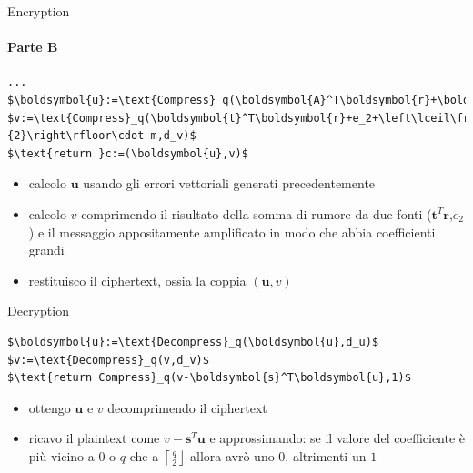 \begin{frame}[fragile]{Encryption}
    \framesubtitle{Parte B}
    \begin{minipage}{0.45\linewidth}
        \begin{lstlisting}[title=Kyber.CPA.Enc(pk\,m):,mathescape=true,firstnumber=4]
...
$\boldsymbol{u}:=\text{Compress}_q(\boldsymbol{A}^T\boldsymbol{r}+\boldsymbol{e_1},d_u)$
$v:=\text{Compress}_q(\boldsymbol{t}^T\boldsymbol{r}+e_2+\left\lceil\frac{q}{2}\right\rfloor\cdot m,d_v)$
$\text{return }c:=(\boldsymbol{u},v)$
        \end{lstlisting}
    \end{minipage}\hfill
    \begin{minipage}{0.5\linewidth}
        \begin{itemize}%
            \item calcolo $\boldsymbol{u}$ usando gli errori vettoriali generati precedentemente
            \item calcolo $v$ comprimendo il risultato della somma di rumore da due fonti ($\boldsymbol{t}^T\boldsymbol{r}$,$e_2$) e il messaggio appositamente amplificato in modo che abbia coefficienti grandi
            \item restituisco il ciphertext, ossia la coppia $(\boldsymbol{u},v)$
        \end{itemize}
    \end{minipage}
\end{frame}

\begin{frame}[fragile]{Decryption}

    \vspace{\baselineskip}

    \begin{minipage}{0.35\linewidth}
        \begin{lstlisting}[title=Kyber.CPA.Dec(sk\,c):,mathescape=true]
$\boldsymbol{u}:=\text{Decompress}_q(\boldsymbol{u},d_u)$
$v:=\text{Decompress}_q(v,d_v)$
$\text{return Compress}_q(v-\boldsymbol{s}^T\boldsymbol{u},1)$
        \end{lstlisting}
    \end{minipage}\hfill
    \begin{minipage}{0.6\linewidth}
        \begin{itemize}%
            \item ottengo $\boldsymbol{u}$ e $v$ decomprimendo il ciphertext
            \item ricavo il plaintext come $v-\boldsymbol{s}^T\boldsymbol{u}$ e approssimando: se il valore del coefficiente è più vicino a $0$ o $q$ che a $\left\lceil\frac{q}{2}\right\rfloor$ allora avrò uno $0$, altrimenti un $1$
        \end{itemize}
    \end{minipage}

\end{frame}


